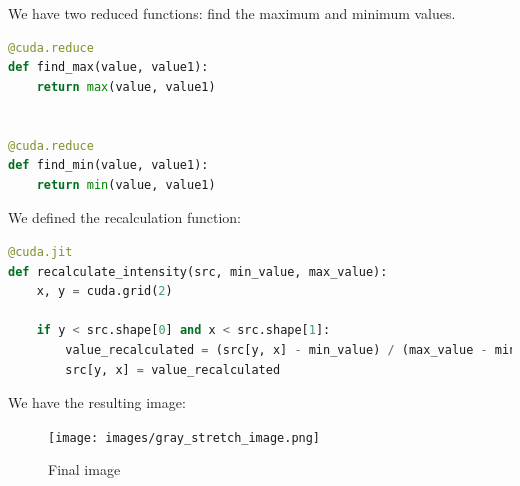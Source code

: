 \documentclass[12pt]{article}
\begin{document}
\noindent
We have two reduced functions: find the maximum and minimum values. 

\begin{lstlisting}[language=Python]
@cuda.reduce
def find_max(value, value1):
    return max(value, value1)


@cuda.reduce
def find_min(value, value1):
    return min(value, value1)

\end{lstlisting}

\noindent
We defined the recalculation function:
\begin{lstlisting}[language=Python]
@cuda.jit
def recalculate_intensity(src, min_value, max_value):
    x, y = cuda.grid(2)

    if y < src.shape[0] and x < src.shape[1]:
        value_recalculated = (src[y, x] - min_value) / (max_value - min_value) * 255
        src[y, x] = value_recalculated
\end{lstlisting}

\noindent
We have the resulting image:
\begin{figure}[H]
\centering
    \texttt{[image: images/gray\_stretch\_image.png]}
    \caption{Final image}
\end{figure}
\end{document}

